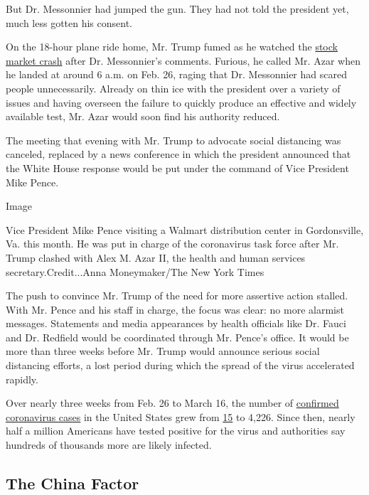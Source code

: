 But Dr. Messonnier had jumped the gun. They had not told the president
yet, much less gotten his consent.

On the 18-hour plane ride home, Mr. Trump fumed as he watched the
\href{https://www.nytimes3xbfgragh.onion/2020/02/24/business/stock-market-coronavirus.html}{stock
market crash} after Dr. Messonnier's comments. Furious, he called Mr.
Azar when he landed at around 6 a.m. on Feb. 26, raging that Dr.
Messonnier had scared people unnecessarily. Already on thin ice with the
president over a variety of issues and having overseen the failure to
quickly produce an effective and widely available test, Mr. Azar would
soon find his authority reduced.

The meeting that evening with Mr. Trump to advocate social distancing
was canceled, replaced by a news conference in which the president
announced that the White House response would be put under the command
of Vice President Mike Pence.

Image

Vice President Mike Pence visiting a Walmart distribution center in
Gordonsville, Va. this month. He was put in charge of the coronavirus
task force after Mr. Trump clashed with Alex M. Azar II, the health and
human services secretary.Credit...Anna Moneymaker/The New York Times

The push to convince Mr. Trump of the need for more assertive action
stalled. With Mr. Pence and his staff in charge, the focus was clear: no
more alarmist messages. Statements and media appearances by health
officials like Dr. Fauci and Dr. Redfield would be coordinated through
Mr. Pence's office. It would be more than three weeks before Mr. Trump
would announce serious social distancing efforts, a lost period during
which the spread of the virus accelerated rapidly.

Over nearly three weeks from Feb. 26 to March 16, the number of
\href{https://www.nytimes3xbfgragh.onion/interactive/2020/us/coronavirus-us-cases.html\#map}{confirmed
coronavirus cases} in the United States grew from
\href{https://www.cdc.gov/media/releases/2020/s0226-Covid-19-spread.html}{15}
to 4,226. Since then, nearly half a million Americans have tested
positive for the virus and authorities say hundreds of thousands more
are likely infected.

\hypertarget{the-china-factor}{%
\subsection{The China Factor}\label{the-china-factor}}

